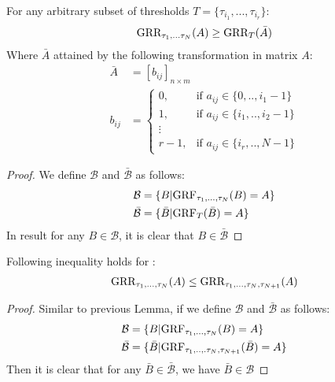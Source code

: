 \documentclass{article}
\begin{document}
\begin{thm:lemma}
For any arbitrary subset of thresholds $T=\{\tau_{i_1},...,\tau_{i_r}\}$:
\begin{align}
\text{GRR}_{\tau_1,...\tau_N}(A)\geq \text{GRR}_{T}(\bar A)
\end{align}
Where $\bar A$ attained by the following transformation in matrix $A$:
\begin{align}
\bar A & =[b_{ij}]_{n\times m}\\
b_{ij} & =
\begin{cases}
	0, & \text{if } a_{ij} \in \{0,..,i_{1}-1\} \\
	1, & \text{if } a_{ij} \in\{i_{1},..,i_{2}-1\} \\
	\vdots\\
	r-1, & \text{if } a_{ij} \in\{i_{r},..,N-1\} 
\end{cases}
\end{align}
\begin{proof}
We define $\mathcal{B}$ and $\bar {\mathcal{B}}$ as follows:
\begin{align}
\mathcal{B} &=\{B|\text{GRF}_{\tau_1,...,\tau_N}(B)=A\}\\
\bar {\mathcal{B}} &=\{\bar B|\text{GRF}_{T}(\bar B)=A\} 
\end{align}
In result for any $B\in \mathcal{B}$, it is clear that $B \in \bar {\mathcal{B}}$
\end{proof}
\end{thm:lemma}

\begin{thm:lemma}

Following inequality holds for \GRR: 
\begin{align}
\text{GRR}_{\tau_{1},...,\tau_{N}}(A)\leq \text{GRR}_{\tau_1,...,\tau_N,\tau_{N+1}}(A) 
\end{align}
\begin{proof}
Similar to previous Lemma, if we define $\mathcal{B}$ and $\bar {\mathcal{B}}$ as follows:
\begin{align}
\mathcal{B} &=\{B|\text{GRF}_{\tau_1,...,\tau_N}(B)=A\}\\
\bar {\mathcal{B}} &=\{\bar B|\text{GRF}_{\tau_1,..,.\tau_N,\tau_{N+1}}(\bar B)=A\} 
\end{align}
Then it is clear that for any $\bar B\in \bar {\mathcal{B}}$, we have $\bar B \in \mathcal{B}$
\end{proof}
\end{thm:lemma}
\end{document}
